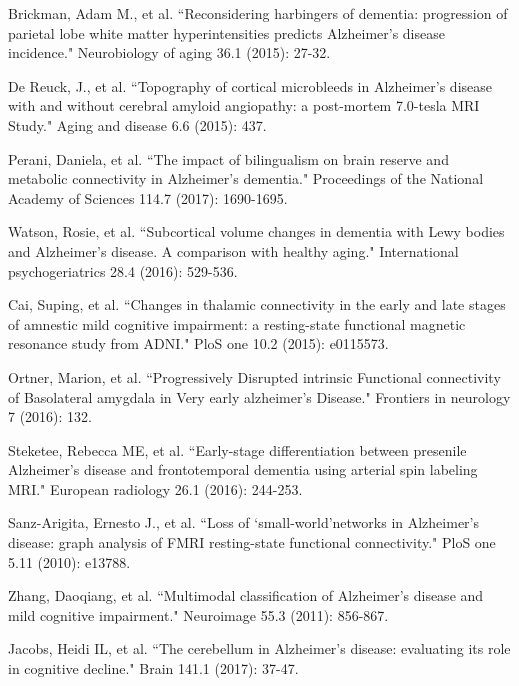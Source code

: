 \begin{thebibliography}{1}
		
		
		
		
		
		
		
		
		
		
		
		
		
		
		Brickman, Adam M., et al. ``Reconsidering harbingers of dementia: progression of parietal lobe white matter hyperintensities predicts Alzheimer's disease incidence." Neurobiology of aging 36.1 (2015): 27-32.
		
		De Reuck, J., et al. ``Topography of cortical microbleeds in Alzheimer’s disease with and without cerebral amyloid angiopathy: a post-mortem 7.0-tesla MRI Study." Aging and disease 6.6 (2015): 437.
		
		Perani, Daniela, et al. ``The impact of bilingualism on brain reserve and metabolic connectivity in Alzheimer's dementia." Proceedings of the National Academy of Sciences 114.7 (2017): 1690-1695.
		
		Watson, Rosie, et al. ``Subcortical volume changes in dementia with Lewy bodies and Alzheimer's disease. A comparison with healthy aging." International psychogeriatrics 28.4 (2016): 529-536.
		
		Cai, Suping, et al. ``Changes in thalamic connectivity in the early and late stages of amnestic mild cognitive impairment: a resting-state functional magnetic resonance study from ADNI." PloS one 10.2 (2015): e0115573.
		
		Ortner, Marion, et al. ``Progressively Disrupted intrinsic Functional connectivity of Basolateral amygdala in Very early alzheimer’s Disease." Frontiers in neurology 7 (2016): 132.
		
		Steketee, Rebecca ME, et al. ``Early-stage differentiation between presenile Alzheimer’s disease and frontotemporal dementia using arterial spin labeling MRI." European radiology 26.1 (2016): 244-253.
		
		Sanz-Arigita, Ernesto J., et al. ``Loss of ‘small-world’networks in Alzheimer's disease: graph analysis of FMRI resting-state functional connectivity." PloS one 5.11 (2010): e13788.
		
		Zhang, Daoqiang, et al. ``Multimodal classification of Alzheimer's disease and mild cognitive impairment." Neuroimage 55.3 (2011): 856-867.
		
		
		Jacobs, Heidi IL, et al. ``The cerebellum in Alzheimer’s disease: evaluating its role in cognitive decline." Brain 141.1 (2017): 37-47.
		
	
		
	\end{thebibliography}
	